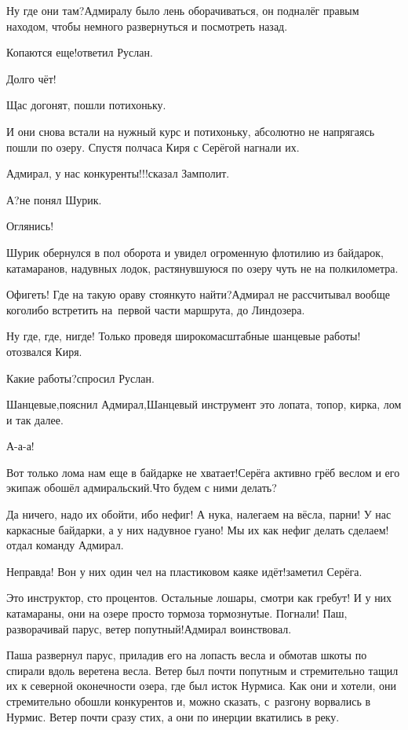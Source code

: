 \diagdash Ну где они там?\mdash Адмиралу было лень оборачиваться, он подналёг правым находом, чтобы немного развернуться и посмотреть назад.

\diagdash Копаются еще!\mdash ответил Руслан.

\diagdash Долго чёт!

\diagdash Щас догонят, пошли потихоньку.

И они снова встали на нужный курс и потихоньку, абсолютно не напрягаясь пошли по озеру. Спустя полчаса Киря с Серёгой нагнали их.

\diagdash Адмирал, у нас конкуренты!!!\mdash сказал Замполит.

\diagdash А?\mdash не понял Шурик.

\diagdash Оглянись!

Шурик обернулся в пол оборота и увидел огроменную флотилию из байдарок, катамаранов, надувных лодок, растянувшуюся по озеру чуть не на полкилометра. 

\diagdash Офигеть! Где на такую ораву стоянку\sdash то найти?\mdash Адмирал не рассчитывал вообще кого\sdash либо встретить на~первой части маршрута, до Линдозера.

\diagdash Ну где, где, нигде! Только проведя широкомасштабные шанцевые работы!\mdash отозвался Киря.

\diagdash Какие работы?\mdash спросил Руслан.

\diagdash Шанцевые,\mdash пояснил Адмирал,\mdash Шанцевый инструмент это лопата, топор, кирка, лом и так далее.

\diagdash А-а-а!

\diagdash Вот только лома нам еще в байдарке не хватает!\mdash Серёга активно грёб веслом и его экипаж обошёл адмиральский.\mdash Что будем с ними делать?

\diagdash Да ничего, надо их обойти, ибо нефиг! А ну\sdash ка, налегаем на вёсла, парни! У нас каркасные байдарки, а у них надувное гуано! Мы их как нефиг делать сделаем!\mdash отдал команду Адмирал.

\diagdash Неправда! Вон у них один чел на пластиковом каяке идёт!\mdash заметил Серёга.

\diagdash Это инструктор, сто процентов. Остальные лошары, смотри как гребут! И у них катамараны, они на озере просто тормоза тормознутые. Погнали! Паш, разворачивай парус, ветер попутный!\mdash Адмирал воинствовал.

Паша развернул парус, приладив его на лопасть весла и обмотав шкоты по спирали вдоль веретена весла. Ветер был почти попутным и стремительно тащил их к северной оконечности озера, где был исток Нурмиса. Как они и хотели, они стремительно обошли конкурентов и, можно сказать, с~разгону ворвались в Нурмис. Ветер почти сразу стих, а они по инерции вкатились в реку.

